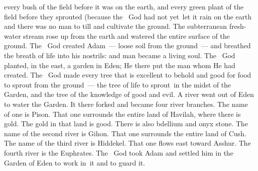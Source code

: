 \begin{inparaenum}
   every bush of the field before it was on the earth, and every green plant of the field before they sprouted (because the \lord\ God had not yet\understood{}\ let it rain on the earth and there was no man to till and cultivate the ground.%
   The subterranean fresh-water stream rose up from the earth and watered the entire surface of the ground.%
   The \lord\ God created Adam~--- loose soil from the ground~--- and breathed the breath of life into his nostrils: and man became a living soul.%
   The \lord\ God planted, in the east, a garden in Eden; He there put the man whom He had created.%
   The \lord\ God made every tree that is excellent to behold and good for food to sprout from the ground~--- the tree of life to sprout\understood{}\ in the midst of the Garden, and the tree of the knowledge of good and evil.%
   A river went out of Eden to water the Garden. It there forked and became four river branches.%
   The name of one is Pison. That one surrounds the entire land of Havilah, where there is gold.%
   The gold in that land is good. There is also bdellium and onyx stone.%
   The name of the second river is Gihon. That one surrounds the entire land of Cush.%
   The name of the third river is Hiddekel. That one flows east toward Asshur. The fourth river is the Euphrates.%
   The \lord\ God took Adam and settled him in the Garden of Eden to work in\understood{}\ it and to guard it.%

\end{inparaenum}
